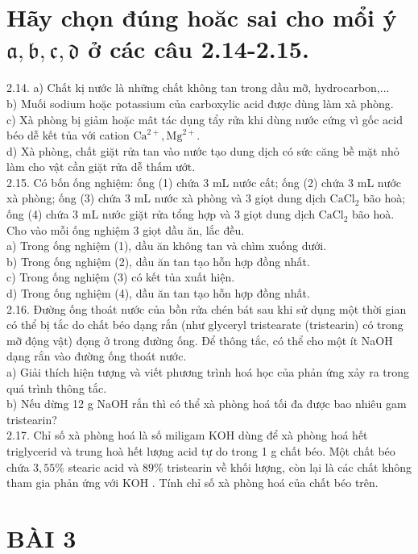 \documentclass[10pt]{article}
\begin{document}
\section*{Hãy chọn đúng hoăc sai cho mổi ý $\mathfrak{a}, \mathfrak{b}, \mathfrak{c}, \mathfrak{d}$ ở các câu 2.14-2.15.}
2.14. a) Chất kị nước là những chất không tan trong dầu mỡ, hydrocarbon,...\\
b) Muối sodium hoặc potassium của carboxylic acid được dùng làm xà phòng.\\
c) Xà phòng bị giảm hoặc mât tác dụng tẩy rửa khi dùng nước cứng vì gốc acid béo dễ kết tủa với cation $\mathrm{Ca}^{2+}, \mathrm{Mg}^{2+}$.\\
d) Xà phòng, chất giặt rửa tan vào nước tạo dung dịch có sức căng bề mặt nhỏ làm cho vật cần giặt rửa dễ thấm ướt.\\
2.15. Có bốn ống nghiệm: ống (1) chứa 3 mL nước cất; ống (2) chứa 3 mL nước xà phòng; ống (3) chứa 3 mL nước xà phòng và 3 giọt dung dịch $\mathrm{CaCl}_{2}$ bão hoà; ống (4) chứa 3 mL nước giặt rửa tổng hợp và 3 giọt dung dịch $\mathrm{CaCl}_{2}$ bão hoà. Cho vào mỗi ống nghiệm 3 giọt dầu ăn, lắc đều.\\
a) Trong ống nghiệm (1), dầu ăn không tan và chìm xuống dưới.\\
b) Trong ống nghiệm (2), dầu ăn tan tạo hỗn hợp đồng nhất.\\
c) Trong ống nghiệm (3) có kết tủa xuất hiện.\\
d) Trong ống nghiệm (4), dầu ăn tan tạo hỗn hợp đồng nhất.\\
2.16. Đường ống thoát nước của bồn rửa chén bát sau khi sử dụng một thời gian có thể bị tắc do chất béo dạng rắn (như glyceryl tristearate (tristearin) có trong mỡ động vật) đọng ở trong đường ống. Để thông tắc, có thể cho một ít NaOH dạng rắn vào đường ống thoát nước.\\
a) Giải thích hiện tượng và viết phương trình hoá học của phản ứng xảy ra trong quá trình thông tắc.\\
b) Nếu dừng 12 g NaOH rắn thì có thể xà phòng hoá tối đa được bao nhiêu gam tristearin?\\
2.17. Chỉ số xà phòng hoá là số miligam KOH dùng để xà phòng hoá hết triglycerid và trung hoà hết lượng acid tự do trong 1 g chất béo. Một chất béo chứa $3,55 \%$ stearic acid và $89 \%$ tristearin về khối lượng, còn lại là các chất không tham gia phản ứng với KOH . Tính chỉ số xà phòng hoá của chất béo trên.

\section*{BÀI 3}
\end{document}
